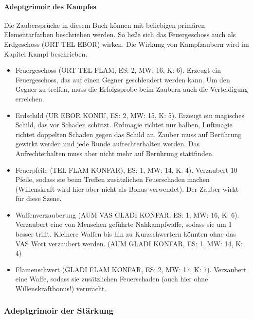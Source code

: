 \documentclass{article}
\begin{document}
\paragraph{Adeptgrimoir des Kampfes}

Die Zaubersprüche in diesem Buch können mit beliebigen primären Elementarfarben beschrieben werden. So ließe sich das
Feuergeschoss auch als Erdgeschoss (ORT TEL EBOR) wirken. Die Wirkung von Kampfzaubern wird im Kapitel Kampf beschrieben.

\begin{itemize}
\item Feuergeschoss (ORT TEL FLAM, ES: 2, MW: 16, K: 6). Erzeugt ein Feuergeschoss, das auf einen Gegner geschleudert werden kann. Um den Gegner zu treffen, muss die Erfolgsprobe beim Zaubern auch die Verteidigung erreichen.
\item Erdschild (UR EBOR KONIU, ES: 2, MW: 15, K: 5). Erzeugt ein magisches Schild, das vor Schaden schützt. Erdmagie richtet nur halben, Luftmagie richtet doppelten Schaden gegen das Schild an. Zauber muss auf Berührung gewirkt werden und jede Runde aufrechterhalten werden. Das Aufrechterhalten muss aber nicht mehr auf Berührung stattfinden.
\item Feuerpfeile (TEL FLAM KONFAR), ES: 1, MW: 14, K: 4). Verzaubert 10 Pfeile, sodass sie beim Treffen zusätzlichen Feuerschaden machen (Willenskraft wird hier aber nicht als Bonus verwendet). Der Zauber wirkt für diese Szene.
\item Waffenverzauberung (AUM VAS GLADI KONFAR, ES: 1, MW: 16, K: 6). Verzaubert eine von Menschen geführte Nahkampfwaffe, sodass sie um 1 besser trifft. Kleinere Waffen bis hin zu Kurzschwertern könnten ohne das VAS Wort verzaubert werden. (AUM GLADI KONFAR, ES: 1, MW: 14, K: 4)
\item Flamenschwert (GLADI FLAM KONFAR, ES: 2, MW: 17, K: 7). Verzaubert eine Waffe, sodass  sie zusätzlichen Feuerschaden (auch hier ohne Willenskraftbonus!) veruracht.
\end{itemize}

\subsubsection{Adeptgrimoir der Stärkung}
\end{document}
